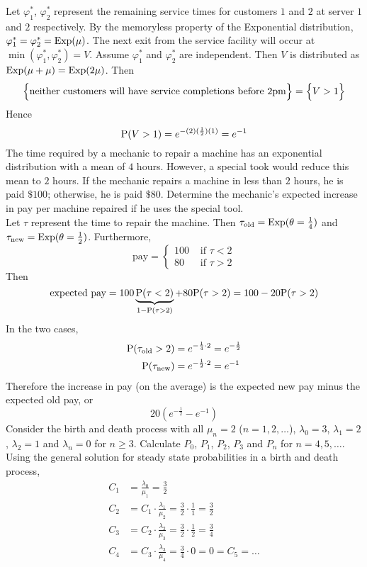 \documentclass[12pt]{article}
\begin{document}
 Let $\varphi_1^*$, $\varphi_2^*$ represent the remaining service times for customers $1$ and $2$ at server $1$ and $2$ respectively. By the memoryless property of the Exponential distribution, $\varphi_1^* = \varphi_2^* = \text{Exp}( \mu )$. The next exit from the service facility will occur at $\min( \varphi_1^*, \varphi_2^*) = V$. Assume $\varphi_1^*$ and $\varphi_2^*$ are independent. Then $V$ is distributed as $\text{Exp}( \mu + \mu ) = \text{Exp}( 2\mu )$. Then $$ \Big\{ \text{neither customers will have service completions before 2pm} \Big\} = \Big\{ V > 1 \Big\}$$ 
 Hence $$\mathrm{P}( V > 1 ) = e^{-(2)(\frac{1}{2})(1)} = e^{-1} $$ 
The time required by a mechanic to repair a machine has an exponential distribution with a mean of $4$ hours. However, a special took would reduce this mean to $2$ hours. If the mechanic repairs a machine in less than $2$ hours, he is paid $\$100$; otherwise, he is paid $\$80$. Determine the mechanic's expected increase in pay per machine repaired if he uses the special tool. \\
Let $\tau$ represent the time to repair the machine. Then $\tau_{\text{old}} = \text{Exp}( \theta  = \frac{1}{4} )$ and $\tau_{\text{new}} = \text{Exp}( \theta = \frac{1}{2} )$. Furthermore, 
$$ \text{pay} = \begin{cases} 100 &\text{ if } \tau < 2 \\ 80 &\text{ if } \tau > 2 \end{cases} $$ 
Then $$\text{expected pay} = 100\underbrace{\mathrm{P}( \tau < 2 )}_{1 - \mathrm{P}( \tau > 2 )} + 80\mathrm{P}( \tau > 2 ) = 100 - 20\mathrm{P}( \tau > 2 )$$ 
In the two cases, $$ \begin{aligned} \mathrm{P}( \tau_{\text{old}} > 2 ) &= e^{-\frac{1}{4}\cdot 2} = e^{-\frac{1}{2}} \\ \mathrm{P}( \tau_{\text{new}} ) &= e^{-\frac{1}{2} \cdot 2} = e^{-1} \end{aligned} $$ 
Therefore the increase in pay (on the average) is the expected new pay minus the expected old pay, or $$ 20(e^{-\frac{1}{2}} - e^{-1}) $$ 
Consider the birth and death process with all $\mu_n = 2$ ($n= 1,2,\dots$), $\lambda_0=3$, $\lambda_1=2$, $\lambda_2 =1$ and $\lambda_n =0$ for $n\geq 3$. Calculate $P_0$, $P_1$, $P_2$, $P_3$ and $P_n$ for $n=4,5,\dots$. \\
Using the general solution for steady state probabilities in a birth and death process, $$ \begin{aligned} C_1 &= \frac{\lambda_0}{\mu_1} = \frac{3}{2} \\ C_2 &= C_1 \cdot \frac{\lambda_1}{\mu_2} = \frac{3}{2} \cdot \frac{1}{1} = \frac{3}{2} \\ C_3 &= C_2 \cdot \frac{\lambda_2}{\mu_3} = \frac{3}{2} \cdot \frac{1}{2} = \frac{3}{4} \\ C_4 &= C_3 \cdot \frac{\lambda_3}{\mu_4} = \frac{3}{4} \cdot 0 = 0 = C_5 = \dots \end{aligned} $$ 
\end{document}

